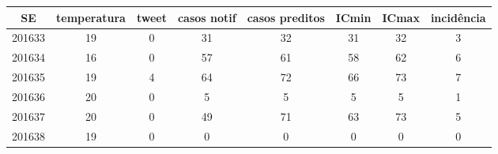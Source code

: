 \begin{tabular}{c|ccccccc}
  \hline
SE & temperatura & tweet & casos notif & casos preditos & ICmin & ICmax & incidência \\ 
  \hline
201633 & 19 & 0 & 31 & 32 & 31 & 32 & 3 \\ 
  201634 & 16 & 0 & 57 & 61 & 58 & 62 & 6 \\ 
  201635 & 19 & 4 & 64 & 72 & 66 & 73 & 7 \\ 
  201636 & 20 & 0 & 5 & 5 & 5 & 5 & 1 \\ 
  201637 & 20 & 0 & 49 & 71 & 63 & 73 & 5 \\ 
  201638 & 19 & 0 & 0 & 0 & 0 & 0 & 0 \\ 
   \hline
\end{tabular}
